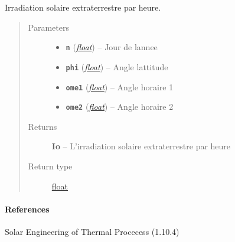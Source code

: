 \documentclass[letterpaper,10pt,english]{sphinxmanual}
\begin{document}
\begin{fulllineitems}
\label{python:solar_mod.irradiation_extraterrestre_horaire}
Irradiation solaire extraterrestre par heure.
\begin{quote}\begin{description}
\item[{Parameters}] \leavevmode\begin{itemize}
\item {} 
\textbf{\texttt{n}} (\href{https://docs.python.org/library/functions.html\#float}{\emph{float}}) -- Jour de lannee

\item {} 
\textbf{\texttt{phi}} (\href{https://docs.python.org/library/functions.html\#float}{\emph{float}}) -- Angle lattitude

\item {} 
\textbf{\texttt{ome1}} (\href{https://docs.python.org/library/functions.html\#float}{\emph{float}}) -- Angle horaire 1

\item {} 
\textbf{\texttt{ome2}} (\href{https://docs.python.org/library/functions.html\#float}{\emph{float}}) -- Angle horaire 2

\end{itemize}

\item[{Returns}] \leavevmode
\textbf{Io} -- L'irradiation solaire extraterrestre par heure

\item[{Return type}] \leavevmode
\href{https://docs.python.org/library/functions.html\#float}{float}

\end{description}\end{quote}
\paragraph{References}

Solar Engineering of Thermal Procecess (1.10.4)

\end{fulllineitems}

\end{document}
